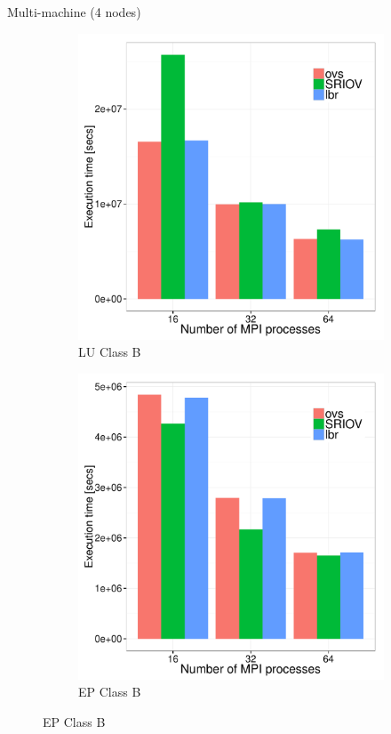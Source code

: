 \documentclass[11pt,xcolor=dvipsnames,presentation]{beamer}
\begin{document}
\begin{frame}[label=sec-4-0-9]{Multi-machine (4 nodes)}
\begin{figure}
  \centering
  \begin{subfigure}[b]{0.42\textwidth}
    \caption{LU Class B}
    \includegraphics[scale=0.25,angle=0]{figures/inter-container-luB.pdf}
  \end{subfigure}
  \begin{subfigure}[b]{0.42\textwidth}
    \caption{EP Class B}
    \includegraphics[scale=0.25,angle=0]{figures/inter-container-epB.pdf}
  \end{subfigure}
\end{figure}
\end{frame}
\end{document}
